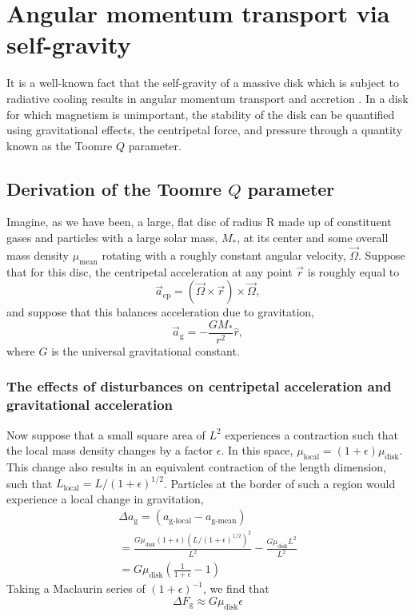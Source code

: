 \documentclass[aps,pra,twocolumn]{revtex4-1}
\begin{document}
\section{\label{section 3} Angular momentum transport via self-gravity}
It is a well-known fact that the self-gravity of a massive disk which is subject to radiative cooling results in angular momentum transport and accretion \cite{armitage2011}.  In a disk for which magnetism is unimportant, the stability of the disk can be quantified using gravitational effects, the centripetal force, and pressure through a quantity known as the Toomre $Q$ parameter.

\subsection{\label{section 3.1} Derivation of the Toomre $Q$ parameter}
Imagine, as we have been, a large, flat disc of radius R made up of constituent gases and particles with a large solar mass, $M_*$, at its center and some overall mass density $\mu_{\text{mean}}$ rotating with a roughly constant angular velocity, $\vec{\Omega}$. Suppose that for this disc, the centripetal acceleration at any point $\vec{r}$ is roughly equal to 
\begin{equation}
\vec{a}_{\text{cp}} = \left( \vec{\Omega} \times \vec{r} \right) \times \vec{\Omega} ,
\end{equation}
and suppose that this balances acceleration due to gravitation,
\begin{equation}
\vec{a}_{\text{g}} = -\frac{G M_*}{r^2}\hat{r}, 
\end{equation}
where $G$ is the universal gravitational constant.

\subsubsection{\label{section 3.1.1} The effects of disturbances on centripetal acceleration and gravitational acceleration}
Now suppose that a small square area of $L^2$ experiences a contraction such that the local mass density changes by a factor $\epsilon$.  In this space, $\mu_{\text{local}} = (1+\epsilon) \mu_{\text{disk}}$. This change also results in an equivalent contraction of the length dimension, such that $L_\text{local} = L/(1 + \epsilon)^{1/2}$. Particles at the border of such a region would experience a local change in gravitation,
\begin{multline}
\Delta a_{\text{g}} =(a_{\text{g-local}} - a_{\text{g-mean}}) \\
= \frac{G\mu_\text{disk} (1 + \epsilon) (L/(1 + \epsilon)^{1/2})^2}{L^2} - \frac{G\mu_{\text{disk}} L^2}{L^2}
\\
= G \mu_{\text{disk}}\left(\frac{1}{1 + \epsilon} - 1  \right) \nonumber
\end{multline}
Taking a Maclaurin series of $(1 + \epsilon)^{-1}$, we find that \cite{toomre1964}
\begin{equation}
\Delta F_\text{g} \approx G\mu_\text{disk}\epsilon
\end{equation}
\end{document}

